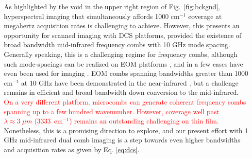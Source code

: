 \documentclass[aip,preprint]{revtex4-1}
\begin{document}
As highlighted by the void in the upper right region of \mbox{Fig. \ref{fig:bckgnd}}, hyperspectral imaging that simultaneously affords 1000 cm$^{-1}$ coverage at megahertz acquisition rates is challenging to achieve. However, this presents an opportunity for scanned imaging with DCS platforms, provided the existence of broad bandwidth mid-infrared frequency combs with 10 GHz mode spacing. Generally speaking, this is a challenging regime for frequency combs, although such mode-spacings can be realized on EOM platforms  \cite{kowligyMidinfraredFrequencyCombs2020}, and in a few cases have even been used for imaging \cite{ullahkhanDirectHyperspectralDualcomb2020,khanSubGHzOpticalResolution2023}. EOM combs spanning bandwidths greater than 1000 cm$^{-1}$ at 10 GHz have been demonstrated in the near-infrared \cite{carlsonBroadbandElectroopticDualcomb2020}, but a  challenge remains in efficient and broad bandwidth down conversion to the mid-infrared\cite{kowligyMidinfraredFrequencyCombs2020}. \textcolor{red}{On a very different platform, microcombs \cite{yuSiliconchipbasedMidinfraredDualcomb2018,yuMicrofluidicMidinfraredSpectroscopy2019} can generate coherent frequency combs spanning up to a few hundred wavenumber. However, coverage well past \mbox{$\lambda \approx 3 \; \mu m$} \mbox{(3333 $\mathrm{cm^{-1}}$)} remains an outstanding challenging on thin film}. Nonetheless, this is a promising direction to explore, and our present effort with 1 GHz mid-infrared dual comb imaging is a step towards even higher bandwidths and acquisition rates as given by Eq. \ref{eq:dcs}.

\end{document}
